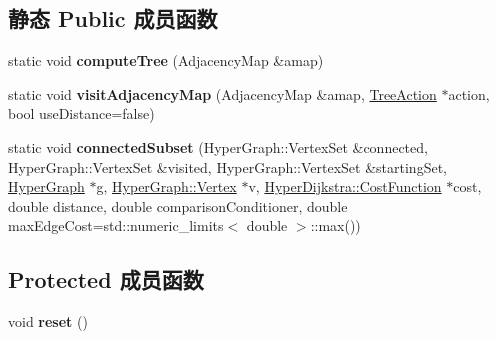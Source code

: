 \subsection*{静态 Public 成员函数}
\begin{DoxyCompactItemize}
\item 
\hypertarget{structg2o_1_1HyperDijkstra_a84a1d7288e1d76369442f89604c5d6de}{static void {\bfseries compute\-Tree} (Adjacency\-Map \&amap)}\label{structg2o_1_1HyperDijkstra_a84a1d7288e1d76369442f89604c5d6de}

\item 
\hypertarget{structg2o_1_1HyperDijkstra_aa73ae495f10f81823b16f26715f32c58}{static void {\bfseries visit\-Adjacency\-Map} (Adjacency\-Map \&amap, \hyperlink{structg2o_1_1HyperDijkstra_1_1TreeAction}{Tree\-Action} $\ast$action, bool use\-Distance=false)}\label{structg2o_1_1HyperDijkstra_aa73ae495f10f81823b16f26715f32c58}

\item 
\hypertarget{structg2o_1_1HyperDijkstra_a846232e98c8175ec2fff784fc3271ad7}{static void {\bfseries connected\-Subset} (Hyper\-Graph\-::\-Vertex\-Set \&connected, Hyper\-Graph\-::\-Vertex\-Set \&visited, Hyper\-Graph\-::\-Vertex\-Set \&starting\-Set, \hyperlink{classg2o_1_1HyperGraph}{Hyper\-Graph} $\ast$g, \hyperlink{classg2o_1_1HyperGraph_1_1Vertex}{Hyper\-Graph\-::\-Vertex} $\ast$v, \hyperlink{structg2o_1_1HyperDijkstra_1_1CostFunction}{Hyper\-Dijkstra\-::\-Cost\-Function} $\ast$cost, double distance, double comparison\-Conditioner, double max\-Edge\-Cost=std\-::numeric\-\_\-limits$<$ double $>$\-::max())}\label{structg2o_1_1HyperDijkstra_a846232e98c8175ec2fff784fc3271ad7}

\end{DoxyCompactItemize}
\subsection*{Protected 成员函数}
\begin{DoxyCompactItemize}
\item 
\hypertarget{structg2o_1_1HyperDijkstra_ad9c39fd01a0740f2beff98c927aaebbd}{void {\bfseries reset} ()}\label{structg2o_1_1HyperDijkstra_ad9c39fd01a0740f2beff98c927aaebbd}

\end{DoxyCompactItemize}
